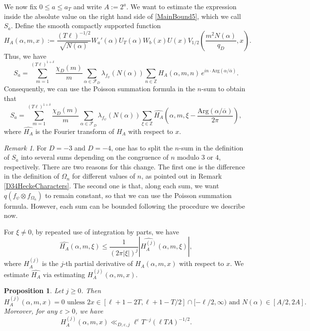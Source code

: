 \documentclass[11pt]{amsart}
\newcommand{\Z}{\mathbb{Z}}
\newtheorem{proposition}[theorem]{Proposition}
\theoremstyle{definition}
\theoremstyle{remark}
\newtheorem{remark}[theorem]{Remark}
\begin{document}
We now fix $0\leq a\leq a_T$ and write $A:= 2^{a}$. We want to estimate the expression inside the absolute value on the right hand side of \eqref{MainBound5}, which we call $S_a$. Define the smooth compactly supported function $$ H_A(\alpha,m,x) := \frac{(T\ell)^{-1/2}}{\sqrt{N(\alpha)}} W_{a}'(\alpha) U_T(\alpha) W_{b}(x) U(x) V_{1/2}\left( \frac{m^2 N(\alpha)}{q_D},x \right).$$
Thus, we have $$ S_a = \sum_{m=1}^{(T\ell)^{1+\delta}} \frac{\chi_{D}(m)}{m} \sum_{\alpha \in \mathcal{F}_{D}} \lambda_{f_{\psi}}(N(\alpha)) \sum_{n\in \Z} H_A(\alpha,m,n) \, e^{in\cdot \mathrm{Arg}(\alpha/\overline{\alpha})}.$$ 
Consequently, we can use the Poisson summation formula in the $n$-sum to obtain that $$ S_a = \sum_{m=1}^{(T\ell)^{1+\delta}} \frac{\chi_{D}(m)}{m} \sum_{\alpha \in \mathcal{F}_{D}} \lambda_{f_{\psi}}(N(\alpha)) \sum_{\xi\in \Z} \widehat{H_A}\left(\alpha,m,\xi - \frac{\mathrm{Arg}(\alpha/\overline{\alpha})}{2\pi} \right),$$ where $\widehat{H_A}$ is the Fourier transform of $H_A$ with respect to $x$. 

\begin{remark}
For $D=-3$ and $D=-4$, one has to split the $n$-sum in the definition of $S_a$ into several sums depending on the congruence of $n$ modulo $3$ or $4$, respectively. There are two reasons for this change. The first one is the difference in the definition of $\Omega_n$ for different values of $n$, as pointed out in Remark \ref{D34HeckeCharacters}. The second one is that, along each sum, we want $q(f_{\psi} \otimes f_{\Omega_n})$ to remain constant, so that we can use the Poisson summation formula. However, each sum can be bounded following the procedure we describe now.
\end{remark}

For $\xi\neq 0$, by repeated use of integration by parts, we have
\begin{equation}
    \widehat{H_A}(\alpha,m,\xi) \leq \frac{1}{(2\pi |\xi|)^{j}} \left| \widehat{H_{A}^{(j)}}(\alpha,m,\xi) \right|, \label{BoundFourierTransDer}
\end{equation}
where $H_A^{(j)}$ is the $j$-th partial derivative of $H_A(\alpha,m,x)$ with respect to $x$. We estimate $\widehat{H_A}$ via estimating $H_{A}^{(j)}(\alpha,m,x)$.

\begin{proposition}\label{BoundDerivativesHA}
Let $j\geq 0$. Then $$ H_{A}^{(j)}(\alpha,m,x) = 0 \text{  unless  } 2x\in \left[ \ell+1-2T, \ell+1-T/2 \right]\cap [-\ell/2,\infty)  \text{  and  } N(\alpha) \in [A/2,2A].$$ Moreover, for any $\varepsilon>0$, we have $$ H_{A}^{(j)}(\alpha,m,x) \ll_{D,\varepsilon,j} \ell^{\varepsilon} T^{-j} (\ell TA)^{-1/2}.$$
\end{proposition}
\end{document}
